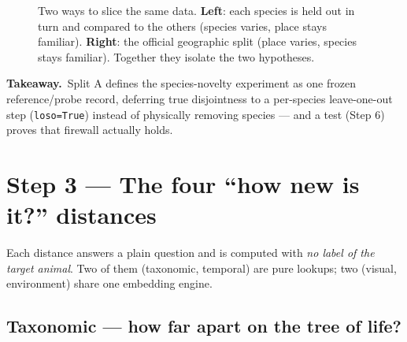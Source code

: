 \documentclass[11pt,a4paper]{article}
\newcommand{\code}[1]{\texttt{#1}}
\newcommand{\takeaway}[1]{\smallskip\noindent%
  \colorbox{forest!8}{\parbox{\dimexpr\linewidth-2\fboxsep\relax}{%
  \small{\color{forest}\textbf{Takeaway.}}\ #1}}\smallskip}
\begin{document}
\begin{figure}[h]
\centering
{}
\caption{Two ways to slice the same data. \textbf{Left}: each species is held out in turn and compared to
the others (species varies, place stays familiar). \textbf{Right}: the official geographic split (place
varies, species stays familiar). Together they isolate the two hypotheses.}
\label{fig:splits}
\end{figure}

\takeaway{Split A defines the species-novelty experiment as one frozen reference/probe record, deferring
true disjointness to a per-species leave-one-out step (\code{loso=True}) instead of physically removing
species --- and a test (Step 6) proves that firewall actually holds.}

\section{Step 3 --- The four ``how new is it?'' distances}
Each distance answers a plain question and is computed with \emph{no label of the target animal}. Two of
them (taxonomic, temporal) are pure lookups; two (visual, environment) share one embedding engine.

\subsection*{Taxonomic --- how far apart on the tree of life?}
\end{document}
